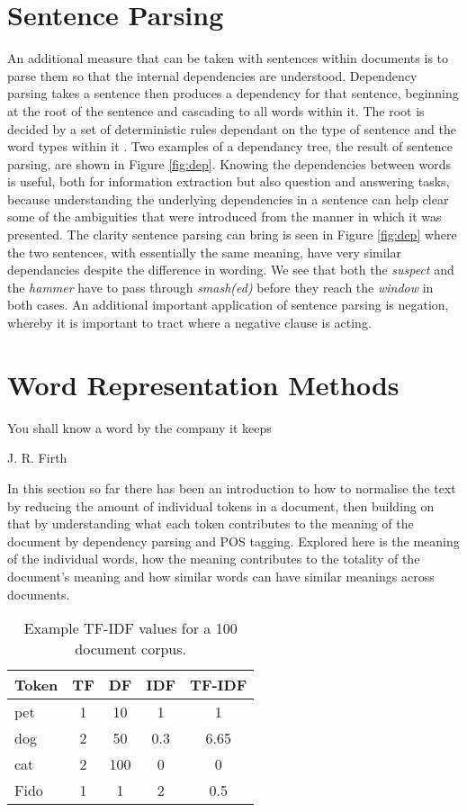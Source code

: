\section{Sentence Parsing} An additional measure that can be taken with sentences within documents is to parse them so that the internal dependencies are understood. Dependency parsing takes a sentence then produces a dependency for that sentence, beginning at the root of the sentence and cascading to all words within it. The root is decided by a set of deterministic rules dependant on the type of sentence and the word types within it  \parencite{eisenstein2018natural}.  Two examples of a dependancy tree, the result of sentence parsing, are shown in Figure  \ref{fig:dep}. Knowing the dependencies between words is useful, both for information extraction but also question and answering tasks, because understanding the underlying dependencies in a sentence can help clear some of the ambiguities that were introduced from the manner in which it was presented. The clarity sentence parsing can bring is seen in Figure \ref{fig:dep} where the two sentences, with essentially the same meaning, have very similar dependancies despite the difference in wording. We see that both the \emph{suspect} and the \emph{hammer} have to pass through \emph{smash(ed)} before they reach the \emph{window} in both cases. An additional important application of sentence parsing is negation, whereby it is important to tract where a negative clause is acting. 


\section{Word Representation Methods}


\epigraph{\centering You shall know a word by the company it keeps}{J. R. Firth}


In this section so far there has been an introduction to how to normalise the text by reducing the amount of individual tokens in a document, then building on that by understanding what each token contributes to the meaning of the document by dependency parsing and POS tagging. Explored here is the meaning of the individual words, how the meaning contributes to the totality of the document’s meaning and how similar words can have similar meanings across documents.


\begin{table}[]
\centering
\begin{tabular}{@{}lcccc@{}}
\toprule
\textbf{Token} & \multicolumn{1}{l}{\textbf{TF}} & \multicolumn{1}{l}{\textbf{DF}} & \multicolumn{1}{l}{\textbf{IDF}} & \multicolumn{1}{l}{\textbf{TF-IDF}} \\ \midrule
pet  & 1 & 10  & 1   & 1    \\
dog  & 2 & 50  & 0.3 & 6.65 \\
cat  & 2 & 100 & 0   & 0    \\
Fido & 1 & 1   & 2   & 0.5  \\ \bottomrule
\end{tabular}
\caption{\label{tab:search} Example TF-IDF values for a 100 document corpus.}
\end{table}


